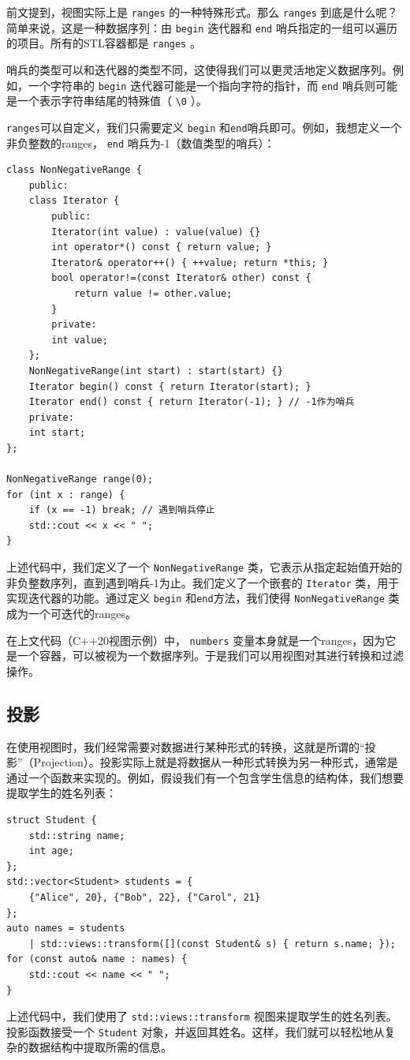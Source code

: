 前文提到，视图实际上是 \verb|ranges| 的一种特殊形式。那么 \verb|ranges| 到底是什么呢？简单来说，这是一种数据序列：由 \verb|begin| 迭代器和 \verb|end| 哨兵指定的一组可以遍历的项目。所有的STL容器都是 \verb|ranges| 。

哨兵的类型可以和迭代器的类型不同，这使得我们可以更灵活地定义数据序列。例如，一个字符串的 \verb|begin| 迭代器可能是一个指向字符的指针，而 \verb|end| 哨兵则可能是一个表示字符串结尾的特殊值（ \verb|\0| ）。

\verb|ranges|可以自定义，我们只需要定义 \verb|begin| 和\verb|end|哨兵即可。例如，我想定义一个非负整数的ranges， \verb|end| 哨兵为-1（数值类型的哨兵）：
\begin{verbatim}
class NonNegativeRange {
    public:
    class Iterator {
        public:
        Iterator(int value) : value(value) {}
        int operator*() const { return value; }
        Iterator& operator++() { ++value; return *this; }
        bool operator!=(const Iterator& other) const {
            return value != other.value;
        }
        private:
        int value;
    };
    NonNegativeRange(int start) : start(start) {}
    Iterator begin() const { return Iterator(start); }
    Iterator end() const { return Iterator(-1); } // -1作为哨兵
    private:
    int start;
};

NonNegativeRange range(0);
for (int x : range) {
    if (x == -1) break; // 遇到哨兵停止
    std::cout << x << " ";
}
\end{verbatim}
上述代码中，我们定义了一个 \verb|NonNegativeRange| 类，它表示从指定起始值开始的非负整数序列，直到遇到哨兵-1为止。我们定义了一个嵌套的 \verb|Iterator| 类，用于实现迭代器的功能。通过定义 \verb|begin| 和\verb|end|方法，我们使得 \verb|NonNegativeRange| 类成为一个可迭代的ranges。

在上文代码（C++20视图示例）中， \verb|numbers| 变量本身就是一个ranges，因为它是一个容器，可以被视为一个数据序列。于是我们可以用视图对其进行转换和过滤操作。

\subsection{投影}

在使用视图时，我们经常需要对数据进行某种形式的转换，这就是所谓的“投影”（Projection）。投影实际上就是将数据从一种形式转换为另一种形式，通常是通过一个函数来实现的。例如，假设我们有一个包含学生信息的结构体，我们想要提取学生的姓名列表：
\begin{verbatim}
struct Student {
    std::string name;
    int age;
};
std::vector<Student> students = {
    {"Alice", 20}, {"Bob", 22}, {"Carol", 21}
};
auto names = students
    | std::views::transform([](const Student& s) { return s.name; });
for (const auto& name : names) {
    std::cout << name << " ";
}
\end{verbatim}
上述代码中，我们使用了 \verb|std::views::transform| 视图来提取学生的姓名列表。投影函数接受一个 \verb|Student| 对象，并返回其姓名。这样，我们就可以轻松地从复杂的数据结构中提取所需的信息。

